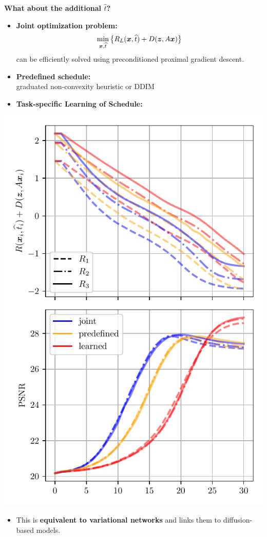 \documentclass[a1paper,fleqn]{betterportraitposter}
\renewcommand{\emph}[1]{\textbf{\color{myblue}#1}}
\theoremstyle{plain}
\begin{document}
{\begin{multicols}{2}
\begin{minipage}[t]{.59\linewidth}
\textbf{What about the additional $\widehat{t}$?}
\begin{itemize}
\item \emph{Joint optimization problem:} 
\[
\min_{{\bm{x}},\widehat{t}}\left\{R_L({\bm{x}},\widehat{t}) + D({\bm{z}},A{\bm{x}})\right\}
\]
can be efficiently solved using preconditioned proximal gradient descent.\\[-1.5ex]
\item \emph{Predefined schedule:}\\
graduated non-convexity heuristic or DDIM\\[-1.5ex]
\item \emph{Task-specific Learning of Schedule:}
\end{itemize}
\end{minipage}%
\hfill\begin{minipage}[t]{.4\linewidth}
\vspace{0pt}
    \begin{flushright}
        \includegraphics[width=.9\linewidth]{img/plots_denoise}
    \end{flushright}
\end{minipage}
\vspace*{1em}
\begin{itemize}
    \item[] This is \emph{equivalent to variational networks} and links them to diffusion-based models.
\end{itemize}
\columnbreak


\end{multicols}
}
\end{document}
